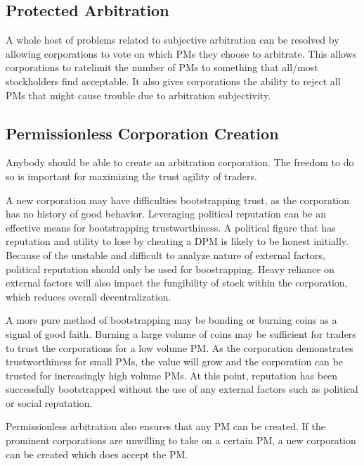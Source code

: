 \documentclass[onecolumn]{article}
\begin{document}
\subsection{Protected Arbitration}
A whole host of problems related to subjective arbitration can be resolved by allowing corporations to vote on which PMs they choose to arbitrate.
This allows corporations to ratelimit the number of PMs to something that all/most stockholders find acceptable.
It also gives corporations the ability to reject all PMs that might cause trouble due to arbitration subjectivity.

\subsection{Permissionless Corporation Creation}
Anybody should be able to create an arbitration corporation.
The freedom to do so is important for maximizing the trust agility of traders.

A new corporation may have difficulties bootstrapping trust, as the corporation has no history of good behavior.
Leveraging political reputation can be an effective means for bootstrapping trustworthiness.
A political figure that has reputation and utility to lose by cheating a DPM is likely to be honest initially.
Because of the unstable and difficult to analyze nature of external factors, political reputation should only be used for boostrapping.
Heavy reliance on external factors will also impact the fungibility of stock within the corporation, which reduces overall decentralization.

A more pure method of bootstrapping may be bonding or burning coins as a signal of good faith.
Burning a large volume of coins may be sufficient for traders to trust the corporations for a low volume PM.
As the corporation demonstrates trustworthiness for small PMs, the value will grow and the corporation can be trusted for increasingly high volume PMs.
At this point, reputation has been successfully bootstrapped without the use of any external factors such as political or social reputation.

Permissionless arbitration also ensures that any PM can be created.
If the prominent corporations are unwilling to take on a certain PM, a new corporation can be created which does accept the PM.
\end{document}
